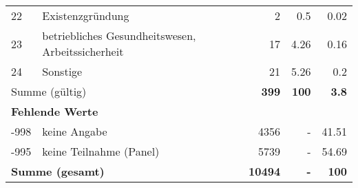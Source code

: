 \begin{longtable}{lXrrr}
        22 & \multicolumn{1}{X}{Existenzgründung} & %
          \num{2} &
          \num[round-mode=places,round-precision=2]{0.5} &
          \num[round-mode=places,round-precision=2]{0.02} \\

        23 & \multicolumn{1}{X}{betriebliches Gesundheitswesen, Arbeitssicherheit} & %
          \num{17} &
          \num[round-mode=places,round-precision=2]{4.26} &
          \num[round-mode=places,round-precision=2]{0.16} \\

        24 & \multicolumn{1}{X}{Sonstige} & %
          \num{21} &
          \num[round-mode=places,round-precision=2]{5.26} &
          \num[round-mode=places,round-precision=2]{0.2} \\

     \midrule
     \multicolumn{2}{l}{Summe (gültig)} &
       \textbf{\num{399}} &
     \textbf{\num{100}} &
       \textbf{\num[round-mode=places,round-precision=2]{3.8}} \\
     \multicolumn{5}{l}{\textbf{Fehlende Werte}}\\
       -998 &
       keine Angabe &
         \num{4356} &
        - &
         \num[round-mode=places,round-precision=2]{41.51} \\
       -995 &
       keine Teilnahme (Panel) &
         \num{5739} &
        - &
         \num[round-mode=places,round-precision=2]{54.69} \\
     \midrule
     \multicolumn{2}{l}{\textbf{Summe (gesamt)}} &
          \textbf{\num{10494}} &
        \textbf{-} &
        \textbf{\num{100}} \\
     \bottomrule
     \end{longtable}
     
